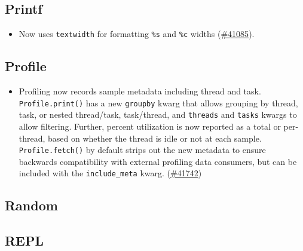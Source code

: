 \hypertarget{5039001780758746770}{}


\subsection{Printf}



\begin{itemize}
\item Now uses \texttt{textwidth} for formatting \texttt{\%s} and \texttt{\%c} widths (\href{https://github.com/JuliaLang/julia/issues/41085}{\#41085}).

\end{itemize}


\hypertarget{301476112402699125}{}


\subsection{Profile}



\begin{itemize}
\item Profiling now records sample metadata including thread and task. \texttt{Profile.print()} has a new \texttt{groupby} kwarg that allows grouping by thread, task, or nested thread/task, task/thread, and \texttt{threads} and \texttt{tasks} kwargs to allow filtering. Further, percent utilization is now reported as a total or per-thread, based on whether the thread is idle or not at each sample. \texttt{Profile.fetch()} by default strips out the new metadata to ensure backwards compatibility with external profiling data consumers, but can be included with the \texttt{include\_meta} kwarg. (\href{https://github.com/JuliaLang/julia/issues/41742}{\#41742})

\end{itemize}


\hypertarget{1261002482238112410}{}


\subsection{Random}



\hypertarget{2420424062759544635}{}


\subsection{REPL}



